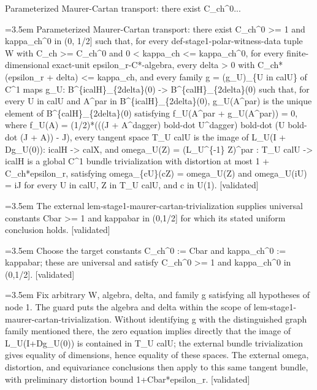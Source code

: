 \documentclass{article}
\newcommand{\step}[1]{\par\noindent\hangindent=3.5em\hangafter=1%
  \makebox[3.5em][l]{\textbf{#1.}}}
\newcommand{\steptag}[1]{\hfill{\small\textsf{[#1]}}}
\begin{document}
\begin{proofbox}{Parameterized Maurer-Cartan transport: there exist C\_ch\textasciicircum{}0...}
\step{1} Parameterized Maurer-Cartan transport: there exist C\_ch\textasciicircum{}0 >= 1 and kappa\_ch\textasciicircum{}0 in (0, 1/2] such that, for every def-stage1-polar-witness-data tuple W with C\_ch >= C\_ch\textasciicircum{}0 and 0 < kappa\_ch <= kappa\_ch\textasciicircum{}0, for every finite-dimensional exact-unit epsilon\_r-C*-algebra, every delta > 0 with C\_ch*(epsilon\_r + delta) <= kappa\_ch, and every family g = (g\_U)\_\{U in calU\} of C\textasciicircum{}1 maps g\_U: B\textasciicircum{}\{icalH\}\_\{2delta\}(0) -> B\textasciicircum{}\{calH\}\_\{2delta\}(0) such that, for every U in calU and A\textasciicircum{}par in B\textasciicircum{}\{icalH\}\_\{2delta\}(0), g\_U(A\textasciicircum{}par) is the unique element of B\textasciicircum{}\{calH\}\_\{2delta\}(0) satisfying f\_U(A\textasciicircum{}par + g\_U(A\textasciicircum{}par)) = 0, where f\_U(A) = (1/2)*(((J + A\textasciicircum{}dagger) bold-dot U\textasciicircum{}dagger) bold-dot (U bold-dot (J + A)) - J), every tangent space T\_U calU is the image of L\_U(I + Dg\_U(0)): icalH -> calX, and omega\_U(Z) = (L\_U\textasciicircum{}\{-1\} Z)\textasciicircum{}par : T\_U calU -> icalH is a global C\textasciicircum{}1 bundle trivialization with distortion at most 1 + C\_ch*epsilon\_r, satisfying omega\_\{cU\}(cZ) = omega\_U(Z) and omega\_U(iU) = iJ for every U in calU, Z in T\_U calU, and c in U(1). \steptag{validated} \\[6pt]
\step{1.1} The external lem-stage1-maurer-cartan-trivialization supplies universal constants Cbar >= 1 and kappabar in (0,1/2] for which its stated uniform conclusion holds. \steptag{validated} \\[4pt]
\step{1.2} Choose the target constants C\_ch\textasciicircum{}0 := Cbar and kappa\_ch\textasciicircum{}0 := kappabar; these are universal and satisfy C\_ch\textasciicircum{}0 >= 1 and kappa\_ch\textasciicircum{}0 in (0,1/2]. \steptag{validated} \\[4pt]
\step{1.3} Fix arbitrary W, algebra, delta, and family g satisfying all hypotheses of node 1. The guard puts the algebra and delta within the scope of lem-stage1-maurer-cartan-trivialization. Without identifying g with the distinguished graph family mentioned there, the zero equation implies directly that the image of L\_U(I+Dg\_U(0)) is contained in T\_U calU; the external bundle trivialization gives equality of dimensions, hence equality of these spaces. The external omega, distortion, and equivariance conclusions then apply to this same tangent bundle, with preliminary distortion bound 1+Cbar*epsilon\_r. \steptag{validated} \\[6pt]

\end{proofbox}
\end{document}
